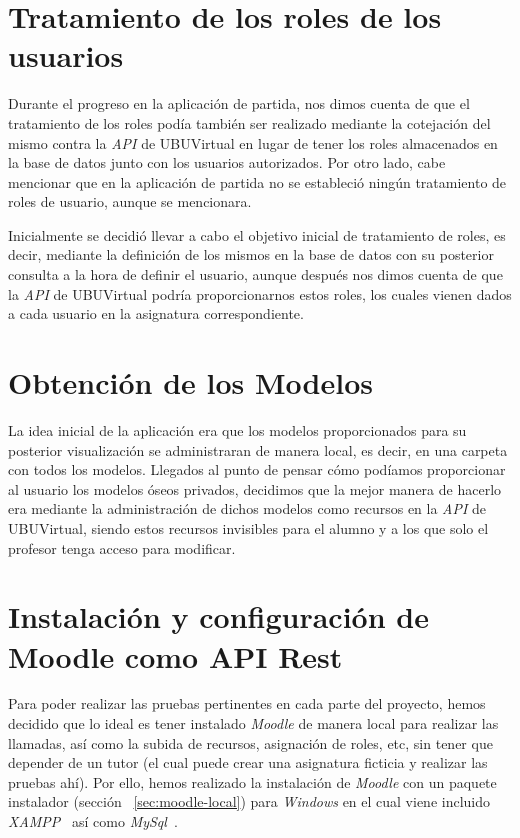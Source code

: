 
\section{Tratamiento de los roles de los usuarios}\label{sec:roles}
Durante el progreso en la aplicación de partida, nos dimos cuenta de que el tratamiento de los roles podía también ser realizado mediante la cotejación del mismo contra la \textit{API} de UBUVirtual en lugar de tener los roles almacenados en la base de datos junto con los usuarios autorizados. Por otro lado, cabe mencionar que en la aplicación de partida no se estableció ningún tratamiento de roles de usuario, aunque se mencionara.

Inicialmente se decidió llevar a cabo el objetivo inicial de tratamiento de roles, es decir, mediante la definición de los mismos en la base de datos con su posterior consulta a la hora de definir el usuario, aunque después nos dimos cuenta de que la \textit{API} de UBUVirtual podría proporcionarnos estos roles, los cuales vienen dados a cada usuario en la asignatura correspondiente.

\section{Obtención de los Modelos}
La idea inicial de la aplicación era que los modelos proporcionados para su posterior visualización se administraran de manera local, es decir, en una carpeta con todos los modelos. Llegados al punto de pensar cómo podíamos proporcionar al usuario los modelos óseos privados, decidimos que la mejor manera de hacerlo era mediante la administración de dichos modelos como recursos en la \textit{API} de UBUVirtual, siendo estos recursos invisibles para el alumno y a los que solo el profesor tenga acceso para modificar.

\section{Instalación y configuración de Moodle como API Rest}
Para poder realizar las pruebas pertinentes en cada parte del proyecto, hemos decidido que lo ideal es tener instalado \textit{Moodle} de manera local para realizar las llamadas, así como la subida de recursos, asignación de roles, etc, sin tener que depender de un tutor (el cual puede crear una asignatura ficticia y realizar las pruebas ahí). Por ello, hemos realizado la instalación de \textit{Moodle} con un paquete instalador (sección ~\ref{sec:moodle-local}) para \textit{Windows} en el cual viene incluido \textit{XAMPP}~\cite{wiki:xampp} así como \textit{MySql}~\cite{wiki:mysql}.

